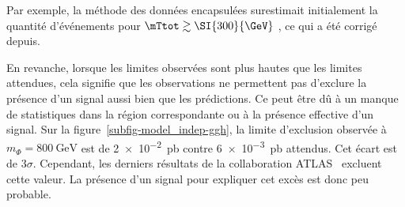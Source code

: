Par exemple, la méthode des données encapsulées surestimait initialement la quantité d'événements
pour $\mTtot \gtrsim \SI{300}{\GeV}$ \cite{Gael_thesis}, ce qui a été corrigé depuis.
\par
En revanche, lorsque les limites observées sont plus hautes que les limites attendues,
cela signifie que les observations ne permettent pas d'exclure la présence d'un signal
aussi bien que les prédictions.
Ce peut être dû à un manque de statistiques dans la région correspondante
ou
à la présence effective d'un signal.
Sur la figure~\ref{subfig-model_indep-ggh},
la limite d'exclusion observée à $m_{\Phi}=\SI{800}{\GeV}$ est de
\SI{2e-2}{\pico\barn}
contre
\SI{6e-3}{\pico\barn} attendus.
Cet écart est de $3\sigma$.
Cependant, les derniers résultats de la collaboration ATLAS~\cite{ATLAS-MSSM-HTT_2020} excluent cette valeur.
La présence d'un signal pour expliquer cet excès est donc peu probable.
